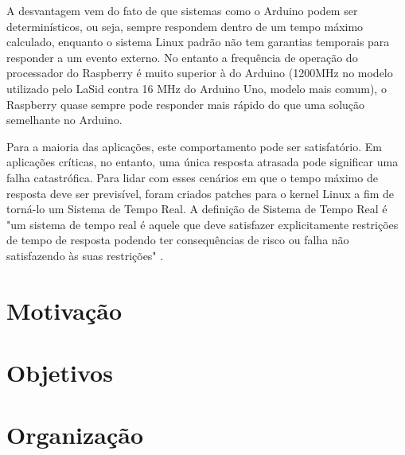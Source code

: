 A desvantagem vem do fato de que sistemas como o Arduino podem ser determinísticos, ou seja, sempre respondem dentro de um tempo máximo calculado, enquanto o sistema Linux padrão não tem garantias temporais para responder a um evento externo. No entanto a frequência de operação do processador do Raspberry é muito superior à do Arduino (1200MHz no modelo utilizado pelo LaSid contra 16 MHz do Arduino Uno, modelo mais comum), o Raspberry quase sempre pode responder mais rápido do que uma solução semelhante no Arduino.

Para a maioria das aplicações, este comportamento pode ser satisfatório. Em aplicações críticas, no entanto, uma única resposta atrasada pode significar uma falha catastrófica. Para lidar com esses cenários em que o tempo máximo de resposta deve ser previsível, foram criados patches para o kernel Linux a fim de torná-lo um Sistema de Tempo Real. A definição de Sistema de Tempo Real é "um sistema de tempo real é aquele que deve satisfazer explicitamente restrições de tempo de resposta podendo ter consequências de risco ou falha não satisfazendo às suas restrições"  \cite{Laplante2004}.

\section{Motivação}
\section{Objetivos}
\section{Organização}


